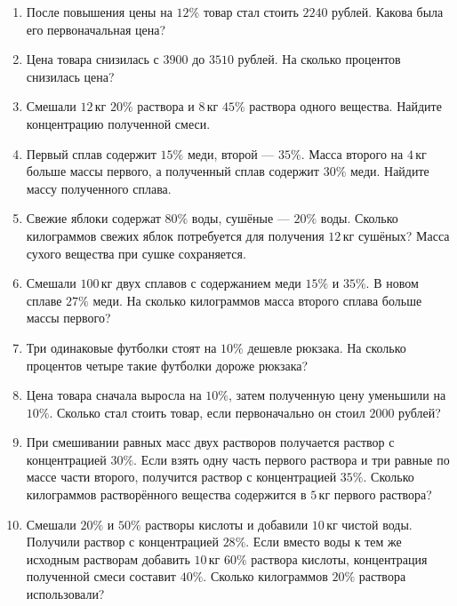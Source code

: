 \documentclass[a4paper,12pt]{article}
\newcommand{\unit}[1]{\,\text{#1}}
\begin{document}
\begin{enumerate}[label=\textbf{\arabic*.},leftmargin=8mm,itemsep=4mm]
\item После повышения цены на $12\%$ товар стал стоить $2240$ рублей. Какова была его первоначальная цена?
\item Цена товара снизилась с $3900$ до $3510$ рублей. На сколько процентов снизилась цена?
\item Смешали $12\unit{кг}$ $20\%$ раствора и $8\unit{кг}$ $45\%$ раствора одного вещества. Найдите концентрацию полученной смеси.
\item Первый сплав содержит $15\%$ меди, второй --- $35\%$. Масса второго на $4\unit{кг}$ больше массы первого, а полученный сплав содержит $30\%$ меди. Найдите массу полученного сплава.
\item Свежие яблоки содержат $80\%$ воды, сушёные --- $20\%$ воды. Сколько килограммов свежих яблок потребуется для получения $12\unit{кг}$ сушёных? Масса сухого вещества при сушке сохраняется.
\item Смешали $100\unit{кг}$ двух сплавов с содержанием меди $15\%$ и $35\%$. В новом сплаве $27\%$ меди. На сколько килограммов масса второго сплава больше массы первого?
\item Три одинаковые футболки стоят на $10\%$ дешевле рюкзака. На сколько процентов четыре такие футболки дороже рюкзака?
\item Цена товара сначала выросла на $10\%$, затем полученную цену уменьшили на $10\%$. Сколько стал стоить товар, если первоначально он стоил $2000$ рублей?
\item При смешивании равных масс двух растворов получается раствор с концентрацией $30\%$. Если взять одну часть первого раствора и три равные по массе части второго, получится раствор с концентрацией $35\%$. Сколько килограммов растворённого вещества содержится в $5\unit{кг}$ первого раствора?
\item Смешали $20\%$ и $50\%$ растворы кислоты и добавили $10\unit{кг}$ чистой воды. Получили раствор с концентрацией $28\%$. Если вместо воды к тем же исходным растворам добавить $10\unit{кг}$ $60\%$ раствора кислоты, концентрация полученной смеси составит $40\%$. Сколько килограммов $20\%$ раствора использовали?
\end{enumerate}
\clearpage
\end{document}
